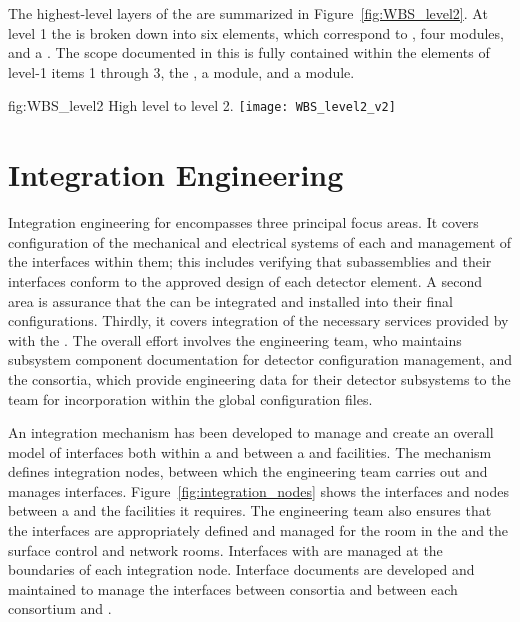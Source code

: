 The highest-level layers of the   are summarized 
in Figure~\ref{fig:WBS_level2}.  At level 1 the  is broken down into 
six elements, which correspond to , %
four 
 modules, and a .  The scope documented %
in this  is fully contained within the elements of level-1 items 1 through 3, the , a   module, and a   module.

\begin{dunefigure}{fig:WBS_level2}
  {High level   to level 2.}
  \texttt{[image: WBS\_level2\_v2]}
\end{dunefigure}

\section{Integration Engineering}
\label{sec:es-coord-integ-sysengr}

Integration engineering for  encompasses three principal focus areas. It %
covers configuration of the mechanical and electrical systems of each  and management of 
the interfaces within them; this includes verifying that subassemblies
and their interfaces %
conform to the approved design of each detector element.
A second area is assurance that the  can be integrated and
installed into their final configurations. Thirdly, it covers %
integration of the necessary services provided by  
with the . The overall effort involves 
the  engineering team, who maintains
subsystem component documentation for detector
configuration management, and 
the consortia, which provide engineering data for their detector subsystems to the  team for incorporation within the global configuration files.


An integration mechanism has been developed to manage and create an
overall model of interfaces both within a  and
between a  and facilities. The mechanism defines
integration nodes, %
between which the  engineering team carries out and
manages interfaces. %
Figure~\ref{fig:integration_nodes} shows the interfaces and nodes between a
 and the facilities it requires. The  engineering
team also ensures that the interfaces are appropriately defined
and managed for the  room in the  and the surface
control and network rooms. Interfaces with 
are managed at the boundaries of each integration node.  
Interface documents are developed and maintained to manage the
interfaces between consortia and between each consortium and 
.


